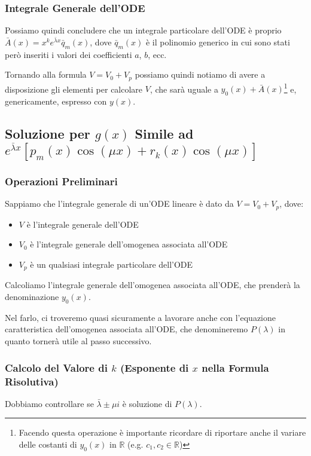 \documentclass[a4paper,11pt]{article}
\begin{document}
\subsubsection[Integrale Generale]{Integrale Generale dell'ODE}
Possiamo quindi concludere che un integrale particolare dell'ODE è proprio $\bar{A}(x)=x^k e^{\bar{\lambda}x}\bar{q}_m(x)$, dove $\bar{q}_m(x)$ è il polinomio generico in cui sono stati però inseriti i valori dei coefficienti $a$, $b$, ecc.

\noindent Tornando alla formula $V=V_0+V_p$ possiamo quindi notiamo di avere a disposizione gli elementi per calcolare $V$, che sarà uguale a $y_0(x)+\bar{A}(x)$\footnote[3]{Facendo questa operazione è importante ricordare di riportare anche il variare delle costanti di $y_0(x)$ in $\mathbb{R}$ (e.g. $c_1,c_2\in\mathbb{R}$)} e, genericamente, espresso con $y(x)$.

\subsection[\texorpdfstring{$g(x)$ è Combinazione di Espon. Polin. e Trig.}{g(x) da Esponenziale, Polinomio e Trig.}]{Soluzione per $g(x)$ Simile ad $e^{\bar{\lambda} x}[p_m(x)\cos{(\mu x)}+r_k(x)\cos{(\mu x)}]$}

\subsubsection{Operazioni Preliminari}
Sappiamo che l'integrale generale di un'ODE lineare è dato da $V=V_0+V_p$, dove:
\begin{itemize}
	\item $V$ è l'integrale generale dell'ODE
	\item $V_0$ è l'integrale generale dell'omogenea associata all'ODE
	\item $V_p$ è un qualsiasi integrale particolare dell'ODE
\end{itemize}
Calcoliamo l'integrale generale dell'omogenea associata all'ODE, che prenderà la denominazione $y_0(x)$.

\noindent Nel farlo, ci troveremo quasi sicuramente a lavorare anche con l'equazione caratteristica dell'omogenea associata all'ODE, che denomineremo $P(\lambda)$ in quanto tornerà utile al passo successivo.

\subsubsection[\texorpdfstring{Calcolo della $k$ di $x^k$}{Calcolo di k da Formula Risolutiva}]{Calcolo del Valore di $k$ (Esponente di $x$ nella Formula Risolutiva)}
Dobbiamo controllare se $\bar{\lambda}\pm\mu i$ è soluzione di $P(\lambda)$\footnotemark[1].
\end{document}

